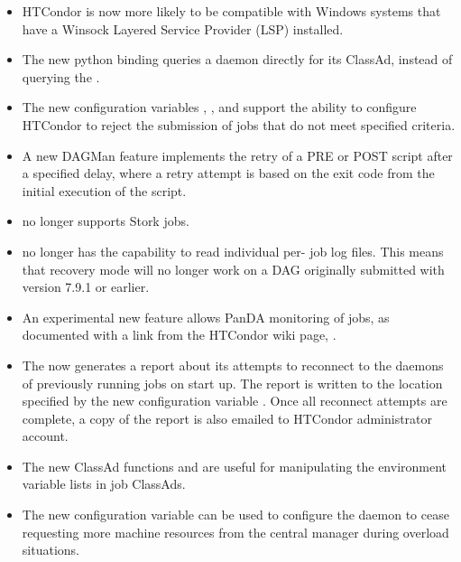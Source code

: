 \begin{itemize}
\item HTCondor is now more likely to be compatible with Windows systems
that have a Winsock Layered Service Provider (LSP) installed.

\item The new  python binding queries a daemon
directly for its ClassAd, 
instead of querying the .

\item The new configuration variables ,
, 
and 
support the ability to configure HTCondor to reject the submission
of jobs that do not meet specified criteria.

\item A new DAGMan feature implements the retry of a PRE or POST script 
after a specified delay, 
where a retry attempt is
based on the exit code from the initial execution of the script.

\item {} no longer supports Stork jobs.

\item {} no longer has the capability to read individual per-
job log files.  This means that recovery mode will no longer work on a
DAG originally submitted with version 7.9.1 or earlier.

\item An experimental new feature allows PanDA monitoring of jobs,
as documented with a link from the HTCondor wiki page,
.

\item The  now generates a report about its attempts to
reconnect to the  daemons of previously running jobs on start up.
The report is written to the location specified by the new configuration
variable .
Once all reconnect attempts are complete, a copy of the report is also
emailed to HTCondor administrator account.

\item The new ClassAd functions  and 
 are
useful for manipulating the environment variable lists in job ClassAds.

\item The new configuration variable 
can be used to configure the  daemon
 to cease requesting more machine resources
from the central manager during overload situations.


\end{itemize}
